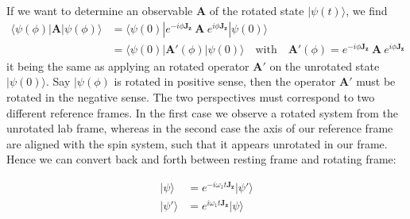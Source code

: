 \documentclass[11.5pt,a4paper]{article}
\begin{document}
If we want to determine an observable $\mathbf{A}$ of the rotated state $|\psi(t)\rangle$, we find
\begin{align}
  \langle \psi(\phi) | \mathbf{A} | \psi(\phi) \rangle & = \langle \psi(0) | e^{-i \phi \mathbf{J_z}}\ \mathbf{A}\ e^{i \phi \mathbf{J_z}} | \psi(0) \rangle \\
  & = \langle \psi(0) | \mathbf{A'}(\phi) | \psi(0) \rangle \quad \text{with} \quad \mathbf{A'}(\phi) = e^{-i \phi \mathbf{J_z}}\ \mathbf{A}\ e^{i \phi \mathbf{J_z}}
\end{align}
it being the same as applying an rotated operator $\mathbf{A'}$ on the unrotated state $|\psi(0)\rangle$. Say $|\psi(\phi)$ is rotated in positive sense, then the operator $\mathbf{A'}$ must be rotated in the negative sense. The two perspectives must correspond to two different reference frames. In the first case we observe a rotated system from the unrotated lab frame, whereas in the second case the axis of our reference frame are aligned with the spin system, such that it appears unrotated in our frame. Hence we can convert back and forth between resting frame and rotating frame:

\begin{align}
 |\psi \rangle & = e^{-i \omega_1 t \mathbf{J_z}} | \psi' \rangle \\
  |\psi' \rangle & = e^{i \omega_1 t \mathbf{J_z}} | \psi \rangle 
\end{align}
\end{document}

